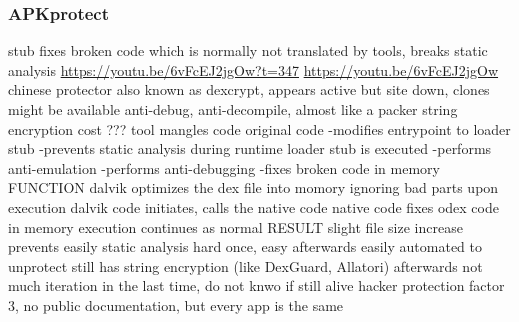 \subsubsection{APKprotect}
stub fixes broken code which is normally not translated by tools, breaks static analysis \newline
\url{https://youtu.be/6vFcEJ2jgOw?t=347}\newline
\url{https://youtu.be/6vFcEJ2jgOw}\newline
chinese protector\newline
also known as dexcrypt, appears active but site down, clones might be available\newline
anti-debug, anti-decompile, almost like a packer\newline
string encryption\newline
cost ???\newline
tool mangles code original code\newline
-modifies entrypoint to loader stub\newline
-prevents static analysis\newline
during runtime loader stub is executed\newline
-performs anti-emulation\newline
-performs anti-debugging\newline
-fixes broken code in memory\newline
FUNCTION\newline
dalvik optimizes the dex file into momory ignoring bad parts\newline
upon execution dalvik code initiates, calls the native code\newline
native code fixes odex code in memory\newline
execution continues as normal\newline
RESULT\newline
slight file size increase\newline
prevents easily static analysis\newline
hard once, easy afterwards\newline
easily automated to unprotect\newline
still has string encryption (like DexGuard, Allatori) afterwards\newline
not much iteration in the last time, do not knwo if still alive\newline
hacker protection factor 3, no public documentation, but every app is the same\newline

